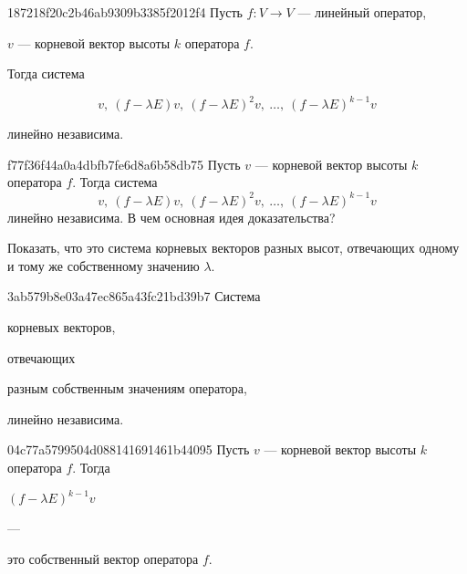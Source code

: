 \begin{note}{187218f20c2b46ab9309b3385f2012f4}
    Пусть \({ f : V \to V }\) --- линейный оператор,\: \begin{icloze}{3}\( v \) --- корневой вектор высоты \( k \) оператора \( f \).\end{icloze}
    Тогда система
    \begin{icloze}{2}
        \[
            v,\: (f - \lambda E) v,\: (f - \lambda E)^{2} v,\: \ldots,\: (f - \lambda E)^{k - 1} v
        \]
    \end{icloze}
    \begin{icloze}{1}линейно независима.\end{icloze}
\end{note}

\begin{note}{f77f36f44a0a4dbfb7fe6d8a6b58db75}
    Пусть \( v \) --- корневой вектор высоты \( k \) оператора \( f \).
    Тогда система
    \[
        v,\: (f - \lambda E) v,\: (f - \lambda E)^{2} v,\: \ldots,\: (f - \lambda E)^{k - 1} v
    \]
    линейно независима.
    В чем основная идея доказательства?

    \begin{cloze}{1}
        Показать, что это система корневых векторов разных высот, отвечающих одному и тому же собственному значению \( \lambda \).
    \end{cloze}
\end{note}

\begin{note}{3ab579b8e03a47ec865a43fc21bd39b7}
    Система \begin{icloze}{3}корневых векторов,\end{icloze} отвечающих \begin{icloze}{2}разным собственным значениям оператора,\end{icloze} \begin{icloze}{1}линейно независима.\end{icloze}
\end{note}

\begin{note}{04c77a5799504d088141691461b44095}
    Пусть \( v \) --- корневой вектор высоты \( k \) оператора \( f \). Тогда \begin{icloze}{2}\( (f - \lambda E)^{k - 1}v \)\end{icloze} --- \begin{icloze}{1}это собственный вектор оператора \( f \).\end{icloze}
\end{note}

